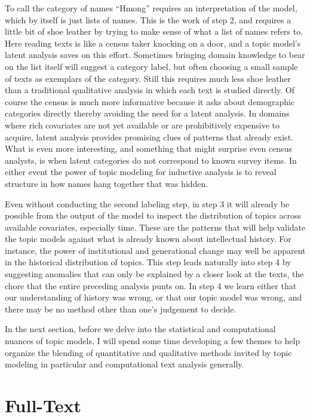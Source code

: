 \documentclass[]{book}
\theoremstyle{definition}
\theoremstyle{definition}
\theoremstyle{definition}
\theoremstyle{remark}
\begin{document}
To call the category of names ``Hmong'' requires an interpretation of
the model, which by itself is just lists of names. This is the work of
step 2, and requires a little bit of shoe leather by trying to make
sense of what a list of names refers to. Here reading texts is like a
census taker knocking on a door, and a topic model's latent analysis
saves on this effort. Sometimes bringing domain knowledge to bear on the
list itself will suggest a category label, but often choosing a small
sample of texts as exemplars of the category. Still this requires much
less shoe leather than a traditional qualitative analysis in which each
text is studied directly. Of course the census is much more informative
because it asks about demographic categories directly thereby avoiding
the need for a latent analysis. In domains where rich covariates are not
yet available or are prohibitively expensive to acquire, latent analysis
provides promising clues of patterns that already exist. What is even
more interesting, and something that might surprise even census
analysts, is when latent categories do not correspond to known survey
items. In either event the power of topic modeling for inductive
analysis is to reveal structure in how names hang together that was
hidden.

Even without conducting the second labeling step, in step 3 it will
already be possible from the output of the model to inspect the
distribution of topics across available covariates, especially time.
These are the patterns that will help validate the topic models against
what is already known about intellectual history. For instance, the
power of institutional and generational change may well be apparent in
the historical distribution of topics. This step leads naturally into
step 4 by suggesting anomalies that can only be explained by a closer
look at the texts, the chore that the entire preceding analysis punts
on. In step 4 we learn either that our understanding of history was
wrong, or that our topic model was wrong, and there may be no method
other than one's judgement to decide.

In the next section, before we delve into the statistical and
computational nuances of topic models, I will spend some time developing
a few themes to help organize the blending of quantitative and
qualitative methods invited by topic modeling in particular and
computational text analysis generally.

\hypertarget{full-text}{%
\section{Full-Text}\label{full-text}}
\end{document}
